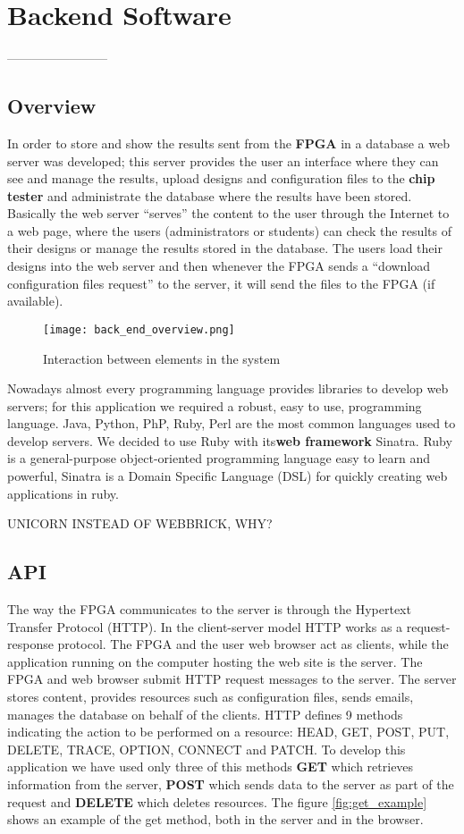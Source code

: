 \chapter{Backend Software}
------------------------

\section{Overview}
  In order to store and show the results sent from the {\bf FPGA} in a database a web server was developed; this server provides the user an interface where they can 
see and manage the results, upload designs and configuration files to the {\bf chip tester} and administrate the database where the results have been stored. Basically
the web server ``serves'' the content to the user through the Internet to a web page, where the users (administrators or students) can check the results of their designs
or manage the results stored in the database. The users load their designs into the web server and then whenever the FPGA sends a ``download configuration files request''
to the server, it will send the files to the FPGA (if available).

\begin{figure}[htb]
\centering
\texttt{[image: back\_end\_overview.png]}
\caption{Interaction between elements in the system}
\label{fig:back_end_structure}
\end{figure}


 Nowadays almost every programming language provides libraries to develop web servers; for this application we required a robust, easy to use, programming language. Java, Python, PhP, Ruby,
Perl are the most common languages used to develop servers. We decided to use Ruby with its{\bf web framework} Sinatra. Ruby is a general-purpose object-oriented programming language easy to learn
and powerful, Sinatra is a Domain Specific Language (DSL) for quickly creating web applications in ruby.

UNICORN INSTEAD OF WEBBRICK, WHY?


\section{API}

The way the FPGA communicates to the server is through the Hypertext Transfer Protocol (HTTP). In the client-server model HTTP works as a request-response protocol. The FPGA and the user web browser act as clients, while the application running 
on the computer hosting the web site is the server. The FPGA and web browser submit HTTP request messages to the server. The server stores content, provides resources such as configuration files, sends emails, manages the database on behalf of the clients. 
HTTP defines 9 methods indicating the action to be performed on a resource: HEAD, GET, POST, PUT, DELETE, TRACE, OPTION, CONNECT and PATCH. To develop this application we have used only three of this methods {\bf GET} which retrieves information from the server, 
{\bf POST} which sends data to the server as part of the request and {\bf DELETE} which deletes resources. The figure \ref{fig:get_example} shows an example of the get method, both in the server and in the browser.

